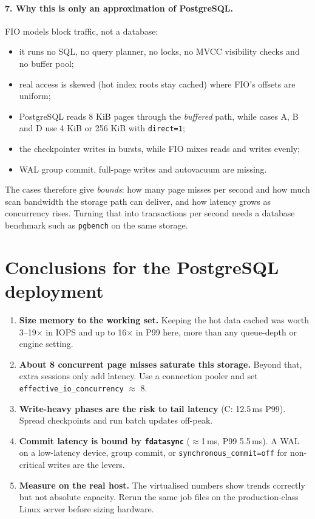 \documentclass[11pt,a4paper]{article}
\begin{document}
\paragraph{7. Why this is only an approximation of PostgreSQL.}
FIO models block traffic, not a database:
\begin{itemize}
  \item it runs no SQL, no query planner, no locks, no MVCC visibility checks and no buffer pool;
  \item real access is skewed (hot index roots stay cached) where FIO's offsets are uniform;
  \item PostgreSQL reads 8 KiB pages through the \emph{buffered} path, while cases A, B and D use 4 KiB or 256 KiB with \texttt{direct=1};
  \item the checkpointer writes in bursts, while FIO mixes reads and writes evenly;
  \item WAL group commit, full-page writes and autovacuum are missing.
\end{itemize}
The cases therefore give \emph{bounds}: how many page misses per second and how much scan bandwidth the
storage path can deliver, and how latency grows as concurrency rises. Turning that into transactions per second
needs a database benchmark such as \texttt{pgbench} on the same storage.

\section{Conclusions for the PostgreSQL deployment}

\begin{enumerate}
  \item \textbf{Size memory to the working set.} Keeping the hot data cached was worth 3--19$\times$ in IOPS
    and up to 16$\times$ in P99 here, more than any queue-depth or engine setting.
  \item \textbf{About 8 concurrent page misses saturate this storage.} Beyond that, extra sessions only add latency. Use a
    connection pooler and set \texttt{effective\_io\_concurrency} $\approx$ 8.
  \item \textbf{Write-heavy phases are the risk to tail latency} (C: 12.5\,ms P99). Spread checkpoints
    and run batch updates off-peak.
  \item \textbf{Commit latency is bound by \texttt{fdatasync}} ($\approx$1\,ms, P99 5.5\,ms). A WAL on a low-latency
    device, group commit, or \texttt{synchronous\_commit=off} for non-critical writes are the levers.
  \item \textbf{Measure on the real host.} The virtualised numbers show trends correctly but not absolute
    capacity. Rerun the same job files on the production-class Linux server before sizing hardware.
\end{enumerate}
\end{document}

